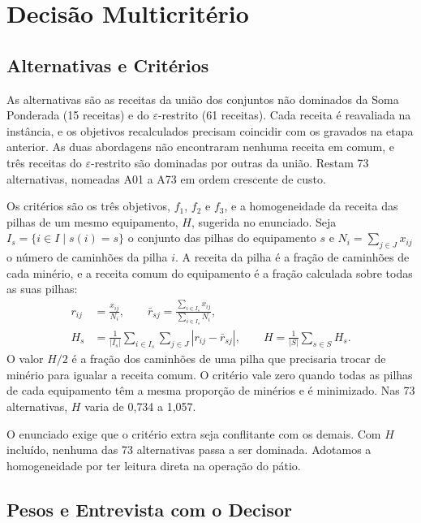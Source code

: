 \documentclass[conference]{IEEEtran}
\begin{document}
\section{Decisão Multicritério}\label{sec:decisao}

\subsection{Alternativas e Critérios}\label{sec:criterios}

As alternativas são as receitas da união dos conjuntos não dominados da Soma Ponderada (15 receitas) e do $\varepsilon$-restrito (61 receitas). Cada receita é reavaliada na instância, e os objetivos recalculados precisam coincidir com os gravados na etapa anterior. As duas abordagens não encontraram nenhuma receita em comum, e três receitas do $\varepsilon$-restrito são dominadas por outras da união. Restam 73 alternativas, nomeadas A01 a A73 em ordem crescente de custo.

Os critérios são os três objetivos, $f_1$, $f_2$ e $f_3$, e a homogeneidade da receita das pilhas de um mesmo equipamento, $H$, sugerida no enunciado. Seja $I_s=\{i\in I \mid s(i)=s\}$ o conjunto das pilhas do equipamento $s$ e $N_i=\sum_{j\in J}x_{ij}$ o número de caminhões da pilha $i$. A receita da pilha é a fração de caminhões de cada minério, e a receita comum do equipamento é a fração calculada sobre todas as suas pilhas:
\begin{align}
r_{ij} &= \frac{x_{ij}}{N_i}, \qquad
\bar r_{sj} = \frac{\sum_{i\in I_s}x_{ij}}{\sum_{i\in I_s}N_i}, \\
H_s &= \frac{1}{|I_s|}\sum_{i\in I_s}\sum_{j\in J}\left|r_{ij}-\bar r_{sj}\right|, \qquad
H = \frac{1}{|S|}\sum_{s\in S}H_s.
\end{align}
O valor $H/2$ é a fração dos caminhões de uma pilha que precisaria trocar de minério para igualar a receita comum. O critério vale zero quando todas as pilhas de cada equipamento têm a mesma proporção de minérios e é minimizado. Nas 73 alternativas, $H$ varia de 0{,}734 a 1{,}057.

O enunciado exige que o critério extra seja conflitante com os demais. Com $H$ incluído, nenhuma das 73 alternativas passa a ser dominada. Adotamos a homogeneidade por ter leitura direta na operação do pátio.

\subsection{Pesos e Entrevista com o Decisor}\label{sec:pesos}
\end{document}
